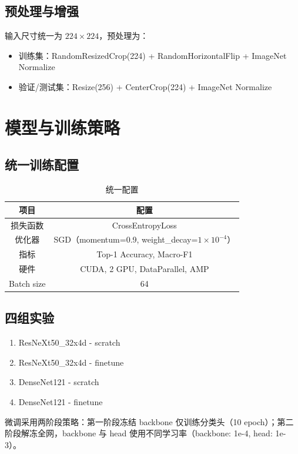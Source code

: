 \documentclass[a4paper,10pt,twocolumn]{article}
\begin{document}
\subsection{预处理与增强}
输入尺寸统一为 $224\times224$，预处理为：
\begin{itemize}
  \item 训练集：RandomResizedCrop(224) + RandomHorizontalFlip + ImageNet Normalize
  \item 验证/测试集：Resize(256) + CenterCrop(224) + ImageNet Normalize
\end{itemize}

\section{模型与训练策略}
\subsection{统一训练配置}
\begin{table}[H]
\centering
\small
\caption{统一配置}
\begin{tabular}{c|c}
\toprule
项目 & 配置 \\
\midrule
损失函数 & CrossEntropyLoss \\
优化器 & SGD（momentum=0.9, weight\_decay=$1\times10^{-4}$） \\
指标 & Top-1 Accuracy, Macro-F1 \\
硬件 & CUDA, 2 GPU, DataParallel, AMP \\
Batch size & 64 \\
\bottomrule
\end{tabular}
\end{table}

\subsection{四组实验}
\begin{enumerate}
  \item ResNeXt50\_32x4d - scratch
  \item ResNeXt50\_32x4d - finetune
  \item DenseNet121 - scratch
  \item DenseNet121 - finetune
\end{enumerate}

微调采用两阶段策略：第一阶段冻结 backbone 仅训练分类头（10 epoch）；第二阶段解冻全网，backbone 与 head 使用不同学习率（backbone: 1e-4, head: 1e-3）。
\end{document}
